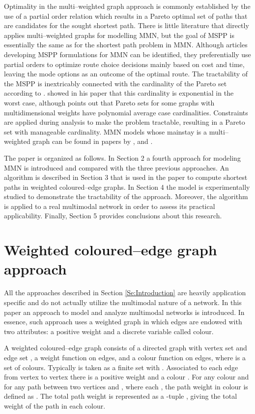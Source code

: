 \documentclass[preprint,authoryear,12pt]{elsarticle}
\begin{document}
Optimality in the multi--weighted graph approach is commonly
established by the use of a partial order relation which results
in a Pareto optimal set of paths that are candidates for the
sought shortest path. There is little literature that directly
applies multi--weighted graphs for modelling MMN, but the goal of
MSPP is essentially the same as for the shortest path problem in MMN.
Although articles developing MSPP formulations for MMN can be identified,
they preferentially use partial orders to optimize route choice
decisions mainly based on cost and time, leaving the mode options
as an outcome of the optimal route.
The tractability of the MSPP is inextricably connected with the
cardinality of the Pareto set according to \cite{Muller2006}.
\cite{Hansen_1980} showed in his paper that this cardinality is exponential
in the worst case, although \cite{Loui1983} points out that Pareto
sets for some graphs with multidimensional weights have polynomial
average case cardinalities.
Constraints are applied during analysis to make the problem tractable,
resulting in a Pareto set with manageable cardinality.
MMN models whose mainstay is a multi--weighted graph can be found
in papers by \cite{Andro2009}, \cite{D95} and \cite{D953}.

The paper is organized as follows.
In Section 2 a fourth approach for modeling MMN is introduced and
compared with the three previous approaches.
An algorithm is described in Section 3 that is used in the paper
to compute shortest paths in weighted coloured--edge graphs.
In Section 4 the model is experimentally studied
to demonstrate the tractability of the approach.
Moreover, the algorithm is applied to a real multimodal network
in order to assess its practical applicability.
Finally, Section 5 provides conclusions about this research.


\section{Weighted coloured--edge graph approach}

All the approaches described in Section \ref{Se:Introduction} are heavily
application specific and do not actually utilize the multimodal nature of
a network. In this paper an approach to model and analyze multimodal networks
is introduced. In essence, such approach uses a weighted graph in which edges are
endowed with two attributes: a positive weight and a discrete variable
called colour.

A weighted coloured--edge graph  consists of a
directed graph  with vertex set  and edge set ,
a weight function  on
edges, and a colour function  on edges,
where  is a set of colours.
Typically  is taken as a finite set with .
Associated to each edge  from vertex  to
vertex  there is a positive weight  and a
colour . For any colour  and for
any path 
between two vertices  and , where each , the path weight  in colour  is defined as
.
The total path weight is represented as a -tuple
 ,
giving the total weight of the path in each colour.
\end{document}
